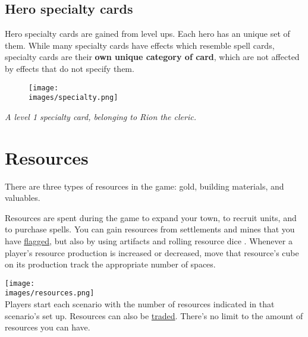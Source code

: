 \documentclass[12pt]{article}
\def\assets{assets}
\def\images{\assets/images}
\def\svgs{\assets/svgs}
\begin{document}
\subsection*{\hypertarget{Specialty}{Hero specialty cards}}
Hero specialty cards are gained from level ups. Each hero has an unique set of them. While many specialty cards have effects which resemble spell cards, specialty cards are their \textbf{own unique category of card}, which are not affected by effects that do not specify them.
\par

\begin{figure}[h]
\centering
\texttt{[image: \\images/specialty.png]}
\end{figure}
\begin{center}
\textit{A level 1 specialty card, belonging to Rion the cleric.}
\end{center}

\clearpage
\section{Resources}
There are three types of resources in the game: gold, building materials, and valuables.

Resources are spent during the game to expand your town, to recruit units, and to purchase spells. You can gain resources from settlements and mines that you have \hyperlink{Categories}{flagged}, but also by using artifacts and rolling resource dice . Whenever a player's resource production is increased or decreased, move that resource's cube on its production track the appropriate number of spaces.\par
\texttt{[image: \\images/resources.png]}\\
Players start each scenario with the number of resources indicated in that scenario’s set up. Resources can also be \hyperlink{Trading}{traded}. There's no limit to the amount of resources you can have.
\end{document}

